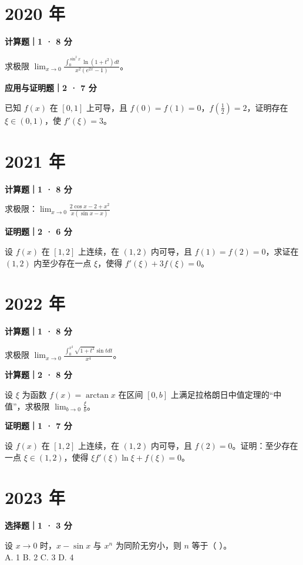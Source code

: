 

\section*{2020 年}


\textbf{计算题｜1 · 8 分}

求极限 $\lim_{x\to0} \frac{\int_0^{\sin^2 x} \ln(1+t^2) dt}{x^2(e^{2x}-1)}$。


\textbf{应用与证明题｜2 · 7 分}

已知 $f(x)$ 在 $[0,1]$ 上可导，且 $f(0) = f(1) = 0$，$f \left(\frac{1}{2}\right) = 2$，证明存在 $\xi \in (0,1)$，使 $f'(\xi) = 3$。


\section*{2021 年}


\textbf{计算题｜1 · 8 分}

求极限：$\lim_{x \to 0} \frac{2\cos x - 2 + x^2}{x(\sin x - x)}$


\textbf{证明题｜2 · 6 分}

设 $f(x)$ 在 $[1, 2]$ 上连续，在 $(1, 2)$ 内可导，且 $f(1) = f(2) = 0$，求证在 $(1, 2)$ 内至少存在一点 $\xi$，使得 $f'(\xi) + 3f(\xi) = 0$。


\section*{2022 年}


\textbf{计算题｜1 · 8 分}

求极限 $\lim_{x \to 0} \frac{\int_0^{x^2} \sqrt{1+t^2} \sin t dt}{x^4}$。


\textbf{计算题｜2 · 8 分}

设 $\xi$ 为函数 $f(x) = \arctan x$ 在区间 $[0, b]$ 上满足拉格朗日中值定理的“中值”，求极限 $\lim_{b \to 0} \frac{\xi}{b}$。


\textbf{证明题｜1 · 7 分}

设 $f(x)$ 在 $[1, 2]$ 上连续，在 $(1, 2)$ 内可导，且 $f(2) = 0$。证明：至少存在一点 $\xi \in (1, 2)$，使得 $\xi f'(\xi)\ln\xi + f(\xi) = 0$。


\section*{2023 年}


\textbf{选择题｜1 · 3 分}

设 $x \to 0$ 时，$x - \sin x$ 与 $x^n$ 为同阶无穷小，则 $n$ 等于（ \quad ）。\\
A. 1 \quad B. 2 \quad C. 3 \quad D. 4


